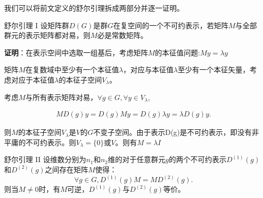 我们可以将前文定义的舒尔引理拆成两部分并逐一证明。

\begin{lemma}{舒尔引理 I}
设矩阵群$D(G)$是群$G$在复空间的一个不可约表示，若矩阵$M$与全部群元的表示矩阵都对易，则$M$必是常数矩阵。
\end{lemma}

\textbf{证明}：在表示空间中选取一组基后，考虑矩阵$M$的本征值问题:$My=\lambda y$

矩阵$M$在复数域中至少有一个本征值$\lambda$，对应与本征值$\lambda$至少有一个本征矢量，考虑对应于本征值$\lambda$的本征子空间$V_\lambda$。

考虑$M$与所有表示矩阵对易，$\forall g\in G,\forall y\in V_\lambda$,

\begin{align}
 MD(g)y=D(g)My=D(g)\lambda y=\lambda D(g)y.
\end{align}

则$M$的本征子空间$V_\lambda$是$V$的$G$不变子空间。由于表示D(g)是不可约表示，即没有非平庸的不可约表示。则$V_\lambda=\{0\}$或$V$。则有$M=\lambda I$

\begin{lemma}{舒尔引理 II}
设维数分别为$n_1$和$n_2$维的对于任意群元$g$的两个不可约表示$D^{(1)}(g)$和$D^{(2)}(g)$之间存在矩阵$M$使得：
\begin{equation}
\forall g\in G,D^{(1)}(g)M=MD^{(2)}(g).
\end{equation}
则当$M\neq 0$时，有$M$可逆，$D^{(1)}(g)$与$D^{(2)}(g)$等价。
\end{lemma}



